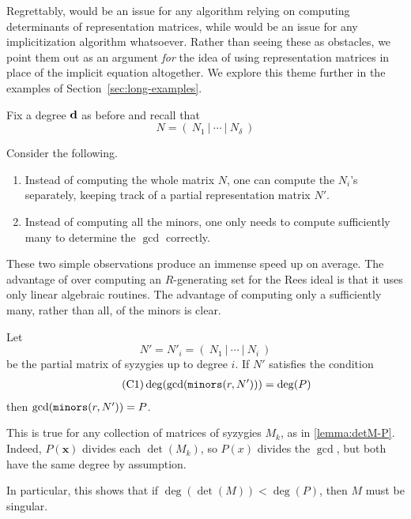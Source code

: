 \documentclass[fleqn,reqno]{amsart}
\numberwithin{first}{chapter}
\begin{document}
\begin{paragraf*}
Regrettably,
 would be an issue for any algorithm
relying on computing determinants of representation matrices,
while 
would be an issue for any implicitization algorithm whatsoever.
Rather than seeing these as obstacles,
we point them out as an argument {\em for} the idea of using
representation matrices in place of the implicit equation altogether.
We explore this theme further in the examples of Section~\ref{sec:long-examples}.
\end{paragraf*}

\begin{paragraf}
\label{par:proposed}
Fix a degree $\mathbf d$ as before and recall that
\[
	N=(~N_1~|~\cdots~|~N_\delta~)
\]

Consider the following.
\begin{enumerate}
\item
\label{itm:N'}
Instead of computing the whole matrix $N$, one can compute the $N_i$'s separately,
keeping track of a partial representation matrix $N'$.
\item
\label{itm:gcd}
Instead of computing all the minors, one only needs to compute sufficiently many to determine
the $\gcd$ correctly.
\end{enumerate}
\end{paragraf}

\begin{paragraf*}
These two simple observations produce an immense speed up on average.
The advantage of  over computing an $R$-generating set for the
Rees ideal is that it uses only linear algebraic routines.
The advantage of computing only a sufficiently many, rather than all, of the minors is clear.
\end{paragraf*}

\begin{paragraf}
Let
\[
	N'=N'_i=(~N_1~|~\cdots~|~N_i~)
\]
be the partial matrix of syzygies up to degree $i$.
If $N'$ satisfies the condition
\begin{align}
	\label{C:matrix}
	\tag{C1}
	\deg(\gcd(\mathop{\tt minors}(r,N')))=\deg(P)
\end{align}
then $\gcd(\mathop{\tt minors}(r,N'))=P$.

This is true for any collection of matrices of syzygies $M_k$, as in \eqref{lemma:detM-P}.
Indeed, $P(\mathbf x)$ divides each $\det(M_k)$, so $P(x)$ divides the $\gcd$,
but both have the same degree by assumption.

In particular, this shows that if $\deg(\det(M))<\deg(P)$, then $M$ must be singular.
\end{paragraf}
\end{document}
